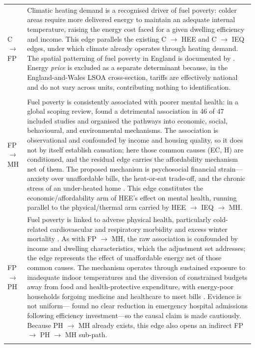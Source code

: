 \begin{longtable}{@{}p{3.8cm}p{11.2cm}@{}}
C $\rightarrow$ FP &
Climatic heating demand is a recognised driver of fuel poverty: colder areas require more delivered energy to maintain an adequate internal temperature, raising the energy cost faced for a given dwelling efficiency and income. This edge parallels the existing C $\rightarrow$ HEE and C $\rightarrow$ IEQ edges, under which climate already operates through heating demand. The spatial patterning of fuel poverty in England is documented by \citet{robinson_decade_2023}. Energy \emph{price} is excluded as a separate determinant because, in the England-and-Wales LSOA cross-section, tariffs are effectively national and do not vary across units, contributing nothing to identification. \\
\addlinespace

\multicolumn{2}{@{}l}{\textit{Outbound edges from Fuel Poverty}}\\
\addlinespace

FP $\rightarrow$ MH &
Fuel poverty is consistently associated with poorer mental health: in a global scoping review, \citet{khavandi_mental_2024} found a detrimental association in 46 of 47 included studies and organised the pathways into economic, social, behavioural, and environmental mechanisms. The association is observational and confounded by income and housing quality, so it does not by itself establish causation; here those common causes (EC, H) are conditioned, and the residual edge carries the affordability mechanism net of them. The proposed mechanism is psychosocial financial strain---anxiety over unaffordable bills, the heat-or-eat trade-off, and the chronic stress of an under-heated home \citep{longhurst_emotions_2019, grey_short-term_2017}. This edge constitutes the economic/affordability arm of HEE's effect on mental health, running parallel to the physical/thermal arm carried by HEE $\rightarrow$ IEQ $\rightarrow$ MH. \\
\addlinespace

FP $\rightarrow$ PH &
Fuel poverty is linked to adverse physical health, particularly cold-related cardiovascular and respiratory morbidity and excess winter mortality \citep{marmot_review_team_health_2011, maidment_impact_2014}. As with FP $\rightarrow$ MH, the raw association is confounded by income and dwelling characteristics, which the adjustment set addresses; the edge represents the effect of unaffordable energy net of those common causes. The mechanism operates through sustained exposure to inadequate indoor temperatures and the diversion of constrained budgets away from food and health-protective expenditure, with energy-poor households forgoing medicine and healthcare to meet bills \citep{shapira_no_2023}. Evidence is not uniform---\citet{poortinga_health_2018} found no clear reduction in emergency hospital admissions following efficiency investment---so the causal claim is made cautiously. Because PH $\rightarrow$ MH already exists, this edge also opens an indirect FP $\rightarrow$ PH $\rightarrow$ MH sub-path. \\
\addlinespace


\end{longtable}
